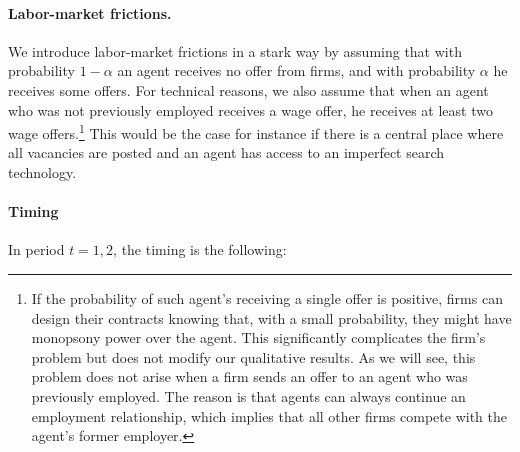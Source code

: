 \documentclass[12pt,american]{paper}
\theoremstyle{remark}
\begin{document}
\paragraph{Labor-market frictions.} 
We introduce labor-market frictions in a stark way by assuming that with probability $1-\alpha$ an agent receives no offer from firms, and with probability $\alpha$ he receives some offers. For technical reasons, we also assume that when an agent who was not previously employed receives a wage offer, he receives at least two wage offers.\footnote{If the probability of such agent's receiving a single offer is positive, firms can design their contracts knowing that, with a small probability, they might have monopsony power over the agent. This significantly complicates the firm's problem but does not modify our qualitative results. As we will see, this problem does not arise when a firm sends an offer to an agent who was previously employed. The reason is that agents can always continue an employment relationship, which implies that all other firms compete with the agent's former employer.}   This would be the case for instance if there is a central place where all vacancies are posted and an agent  has access to an imperfect search technology.


\paragraph{Timing}
In period $t=1,2$, the timing is the following:
\end{document}

